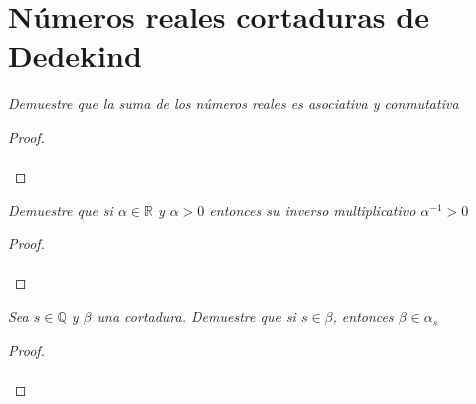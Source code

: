 \documentclass[11pt,letterpaper]{article}
\newcommand{\R}{\mathbb{R}}
\newcommand{\Q}{\mathbb{Q}}
\begin{document}
\section{N\'umeros reales cortaduras de Dedekind}
\begin{tcolorbox}[
	title = \textcolor{black}{\textcolor{white}{Problema 1}},]
\textit{Demuestre que la suma de los n\'umeros reales es asociativa y conmutativa
}
\end{tcolorbox}
\begin{proof}\,\\
    \,\\
\end{proof}
\begin{tcolorbox}[
	title = \textcolor{black}{\textcolor{white}{Problema 2}},]
\textit{Demuestre que si $\alpha \in \R$ y $\alpha>0$ entonces su inverso
multiplicativo $\alpha^{-1}>0$
}
\end{tcolorbox}
\begin{proof}\,\\
    \,\\
\end{proof}
\begin{tcolorbox}[
	title = \textcolor{black}{\textcolor{white}{Problema 3}},]
\textit{Sea $s\in \Q$ y $\beta$ una cortadura. Demuestre que si $s\in \beta$, entonces $\beta\in \alpha_s$
}
\end{tcolorbox}
\begin{proof}\,\\
    \,\\
\end{proof}
\end{document}
